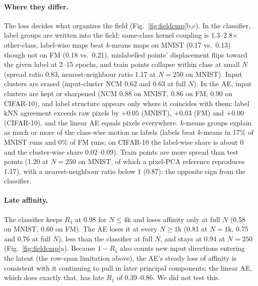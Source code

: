 \documentclass[10pt]{article}
\begin{document}
\paragraph{Where they differ.} The loss decides what organizes the field (Fig.~\ref{fig:fieldcmp}b,c). In the classifier, label groups are written into the field: same-class kernel coupling is 1.3--2.8$\times$ other-class, label-wise maps beat $k$-means maps on MNIST (0.17 vs.\ 0.13) though not on FM (0.18 vs.\ 0.21), mislabelled points' displacement flips toward the given label at 2--15 epochs, and train points collapse within class at small $N$ (spread ratio 0.83, nearest-neighbour ratio 1.17 at $N=250$ on MNIST). Input clusters are erased (input-cluster NCM 0.62 and 0.63 at full $N$). In the AE, input clusters are kept or sharpened (NCM 0.88 on MNIST, 0.86 on FM, 0.90 on CIFAR-10), and label structure appears only where it coincides with them: label kNN agreement exceeds raw pixels by $+0.05$ (MNIST), $+0.03$ (FM) and $+0.00$ (CIFAR-10), and the linear AE equals pixels everywhere. $k$-means groups explain as much or more of the class-wise motion as labels (labels beat $k$-means in 17\% of MNIST runs and 0\% of FM runs; on CIFAR-10 the label-wise share is about 0 and the cluster-wise share 0.02--0.09). Train points are more spread than test points (1.20 at $N=250$ on MNIST, of which a pixel-PCA reference reproduces 1.17), with a nearest-neighbour ratio below 1 (0.87): the opposite sign from the classifier.

\paragraph{Late affinity.} The classifier keeps $R_1$ at 0.98 for $N\le4$k and loses affinity only at full $N$ (0.58 on MNIST, 0.60 on FM). The AE loses it at every $N\ge1$k (0.81 at $N=1$k, 0.75 and 0.76 at full $N$), less than the classifier at full $N$, and stays at 0.94 at $N=250$ (Fig.~\ref{fig:fieldcmp}a). Because $1-R_1$ also counts new input directions entering the latent (the row-span limitation above), the AE's steady loss of affinity is consistent with it continuing to pull in later principal components; the linear AE, which does exactly that, has late $R_1$ of 0.39--0.86. We did not test this.
\end{document}

